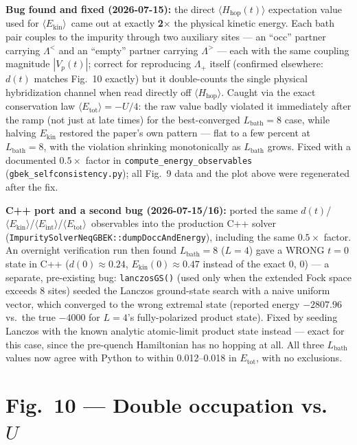 \documentclass[11pt]{article}
\newcommand{\Ekin}{\ensuremath{\langle E_\mathrm{kin}\rangle}}
\newcommand{\Eint}{\ensuremath{\langle E_\mathrm{int}\rangle}}
\newcommand{\Etot}{\ensuremath{\langle E_\mathrm{tot}\rangle}}
\begin{document}
\begin{callout}
\textbf{Bug found and fixed (2026-07-15):} the direct $\langle
H_\mathrm{hop}(t)\rangle$ expectation value used for \Ekin\ came out at
exactly \textbf{2$\times$} the physical kinetic energy. Each bath pair
couples to the impurity through two auxiliary sites --- an ``occ''
partner carrying $\Lambda^<$ and an ``empty'' partner carrying
$\Lambda^>$ --- each with the same coupling magnitude $|V_p(t)|$; correct
for reproducing $\Lambda_+$ itself (confirmed elsewhere: $d(t)$ matches
Fig.\ 10 exactly) but it double-counts the single physical hybridization
channel when read directly off $\langle H_\mathrm{hop}\rangle$. Caught
via the exact conservation law $\Etot=-U/4$: the raw value badly violated
it immediately after the ramp (not just at late times) for the
best-converged $L_\mathrm{bath}=8$ case, while halving $E_\mathrm{kin}$
restored the paper's own pattern --- flat to a few percent at
$L_\mathrm{bath}=8$, with the violation shrinking monotonically as
$L_\mathrm{bath}$ grows. Fixed with a documented $0.5\times$ factor in
\texttt{compute\_energy\_observables} (\texttt{gbek\_selfconsistency.py});
all Fig.\ 9 data and the plot above were regenerated after the fix.
\end{callout}

\begin{callout}
\textbf{C++ port and a second bug (2026-07-15/16):} ported the same
$d(t)$/\Ekin/\Eint/\Etot\ observables into the production C++ solver
(\texttt{ImpuritySolverNeqGBEK::dumpDoccAndEnergy}), including the same
$0.5\times$ factor. An overnight verification run then found
$L_\mathrm{bath}=8$ ($L=4$) gave a WRONG $t=0$ state in C++
($d(0)\approx0.24$, $E_\mathrm{kin}(0)\approx0.47$ instead of the exact
0, 0) --- a separate, pre-existing bug: \texttt{lanczosGS()} (used only
when the extended Fock space exceeds 8 sites) seeded the Lanczos
ground-state search with a naive uniform vector, which converged to the
wrong extremal state (reported energy $-2807.96$ vs.\ the true $-4000$
for $L=4$'s fully-polarized product state). Fixed by seeding Lanczos with
the known analytic atomic-limit product state instead --- exact for this
case, since the pre-quench Hamiltonian has no hopping at all. All three
$L_\mathrm{bath}$ values now agree with Python to within 0.012--0.018 in
$E_\mathrm{tot}$, with no exclusions.
\end{callout}

\section{Fig.\ 10 --- Double occupation vs.\ $U$}
\end{document}
